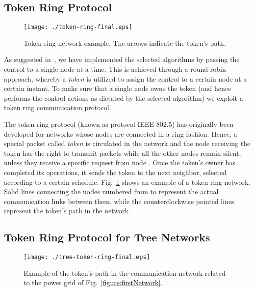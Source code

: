 \documentclass[journal]{IEEEtran}
\newcommand{\fig}[1]{Fig.~\ref{#1}}
\begin{document}
\subsection{Token Ring Protocol}

\begin{figure}
\centering
\texttt{[image: ./token-ring-final.eps]}
\caption{Token ring network example. The arrows indicate the token's path. 
\label{figure:tokenRing}}
\end{figure}

As suggested in~\cite{SurroundControl}, we have implemented the selected algorithms by passing the control to a single node at a time. This is achieved through a round robin approach, whereby a {\it token} is utilized to assign the control to a certain node at a certain instant. To make sure that a single node owns the token (and hence performs the control actions as dictated by the selected algorithm) we exploit a token ring communication protocol.   

The token ring protocol (known as protocol IEEE 802.5) has originally been developed for networks whose nodes are connected in a ring fashion. Hence, a special packet called \emph{token} is circulated in the network and the node  receiving the token has the right to transmit packets while all the other nodes remain silent, unless they receive a specific request from node . Once the token's owner has completed its operations, it sends the token to the next neighbor, selected according to a certain schedule. \fig{figure:tokenRing} shows an example of a token ring network. Solid lines connecting the nodes numbered from  to  represent the actual communication links between them, while the counterclockwise pointed lines represent the token's path in the network.

\subsection{Token Ring Protocol for Tree Networks}
\label{ssec:NOS}
\begin{figure}
\centering
\texttt{[image: ./tree-token-ring-final.eps]}
\caption{Example of the token's path in the communication network related to the power grid of \fig{figure:firstNetwork}.\label{figure:treeTokenRing}}
\end{figure}
\end{document}
